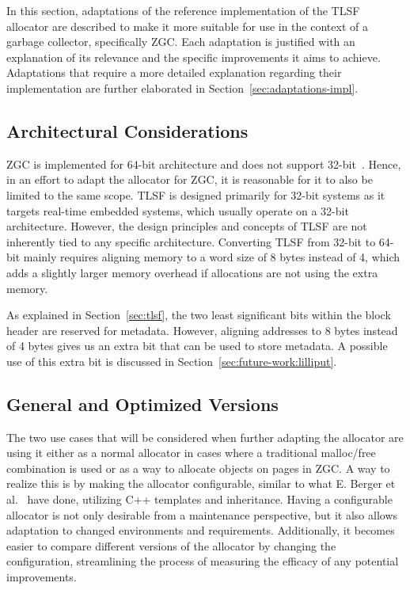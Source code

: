 
In this section, adaptations of the reference implementation of the TLSF allocator are described to make it more suitable for use in the context of a garbage collector, specifically ZGC. Each adaptation is justified with an explanation of its relevance and the specific improvements it aims to achieve. Adaptations that require a more detailed explanation regarding their implementation are further elaborated in Section~\ref{sec:adaptations-impl}.

\subsection{Architectural Considerations}
\label{sec:adaptations:architectural-considerations}

ZGC is implemented for 64-bit architecture and does not support 32-bit~\cite{zgc:deep_dive}. Hence, in an effort to adapt the allocator for ZGC, it is reasonable for it to also be limited to the same scope. TLSF is designed primarily for 32-bit systems as it targets real-time embedded systems, which usually operate on a 32-bit architecture. However, the design principles and concepts of TLSF are not inherently tied to any specific architecture. Converting TLSF from 32-bit to 64-bit mainly requires aligning memory to a word size of 8 bytes instead of 4, which adds a slightly larger memory overhead if allocations are not using the extra memory.

As explained in Section~\ref{sec:tlsf}, the two least significant bits within the block header are reserved for metadata. However, aligning addresses to 8 bytes instead of 4 bytes gives us an extra bit that can be used to store metadata. A possible use of this extra bit is discussed in Section~\ref{sec:future-work:lilliput}.

\subsection{General and Optimized Versions}

The two use cases that will be considered when further adapting the allocator are using it either as a normal allocator in cases where a traditional malloc/free combination is used or as a way to allocate objects on pages in ZGC. A way to realize this is by making the allocator configurable, similar to what E. Berger et al.~\cite{configurable_allocator} have done, utilizing C++ templates and inheritance. Having a configurable allocator is not only desirable from a maintenance perspective, but it also allows adaptation to changed environments and requirements. Additionally, it becomes easier to compare different versions of the allocator by changing the configuration, streamlining the process of measuring the efficacy of any potential improvements.

